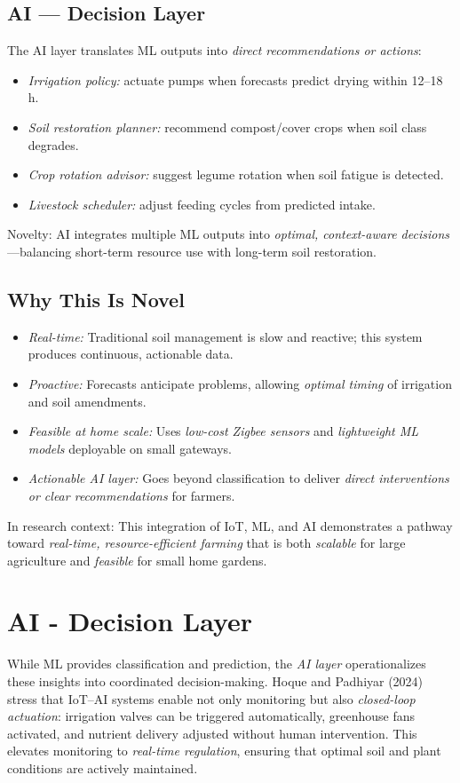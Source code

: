 \documentclass{sigchi}
\begin{document}
\subsection{AI — Decision Layer}
The AI layer translates ML outputs into \emph{direct recommendations or actions}:
\begin{itemize}
\item \emph{Irrigation policy:} actuate pumps when forecasts predict drying within 12–18 h.
\item \emph{Soil restoration planner:} recommend compost/cover crops when soil class degrades.
\item \emph{Crop rotation advisor:} suggest legume rotation when soil fatigue is detected.
\item \emph{Livestock scheduler:} adjust feeding cycles from predicted intake.
\end{itemize}
Novelty: AI integrates multiple ML outputs into \emph{optimal, context-aware decisions}—balancing short-term resource use with long-term soil restoration.

\subsection{Why This Is Novel}
\begin{itemize}
\item \emph{Real-time:} Traditional soil management is slow and reactive; this system produces continuous, actionable data.
\item \emph{Proactive:} Forecasts anticipate problems, allowing \emph{optimal timing} of irrigation and soil amendments.
\item \emph{Feasible at home scale:} Uses \emph{low-cost Zigbee sensors}  and  \emph{lightweight ML models} deployable on small gateways.
\item \emph{Actionable AI layer:} Goes beyond classification to deliver \emph{direct interventions or clear recommendations} for farmers.
\end{itemize}
In research context: This integration of IoT, ML, and AI demonstrates a pathway toward \emph{real-time, resource-efficient farming} that is both \emph{scalable} for large agriculture and \emph{feasible} for small home gardens.

\section{AI - Decision Layer}

While ML provides classification and prediction, the \emph{AI layer} operationalizes these insights into coordinated decision-making.
Hoque and Padhiyar (2024) stress that IoT–AI systems enable not only monitoring but also \emph{closed-loop actuation}: irrigation valves can be triggered automatically, greenhouse fans activated, and nutrient delivery adjusted without human intervention. This elevates monitoring to \emph{real-time regulation}, ensuring that optimal soil and plant conditions are actively maintained.
\end{document}
